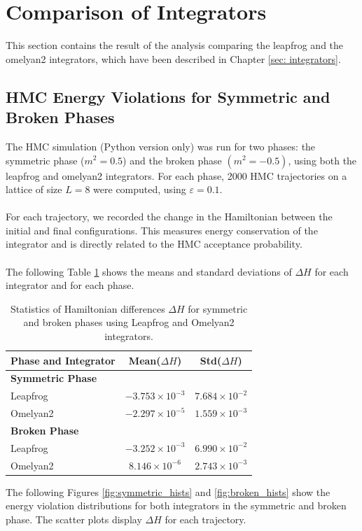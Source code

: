 \section{Comparison of Integrators}\label{sec: int_comparison}
This section contains the result of the analysis comparing the leapfrog and the omelyan2 integrators, which have been described in Chapter \ref{sec: integrators}. 
\subsection{HMC Energy Violations for Symmetric and Broken Phases}
The HMC simulation (Python version only) was run for two phases: the symmetric phase ($m^2 = 0.5$) and the broken phase $(m^2 = -0.5)$, using both the leapfrog and omelyan2 integrators. For each phase, 2000 HMC trajectories on a lattice of size $L = 8$ were computed, using $\varepsilon = 0.1$. \\\\
For each trajectory, we recorded the change in the Hamiltonian between the initial and final configurations. This measures energy conservation of the integrator and is directly related to the HMC acceptance probability.\\\\
The following Table \ref{tab: deltaH_statistics} shows the means and standard deviations of $\Delta H$ for each integrator and for each phase. 
\begin{table}[H]
\centering
\begin{tabular}{lcc}
\hline
\textbf{Phase and Integrator} & \textbf{Mean($\Delta H$)} & \textbf{Std($\Delta H$)} \\
\hline
\textbf{Symmetric Phase} & & \\
\quad Leapfrog & $-3.753\times 10^{-3}$ & $7.684\times 10^{-2}$ \\
\quad Omelyan2 & $-2.297\times 10^{-5}$ & $1.559\times 10^{-3}$ \\
\hline
\textbf{Broken Phase} & & \\
\quad Leapfrog & $-3.252\times 10^{-3}$ & $6.990\times 10^{-2}$ \\
\quad Omelyan2 & $8.146\times 10^{-6}$ & $2.743\times 10^{-3}$ \\
\hline
\end{tabular}
\caption{Statistics of Hamiltonian differences $\Delta H$ for symmetric and broken phases using Leapfrog and Omelyan2 integrators.}
\label{tab: deltaH_statistics}
\end{table}
The following Figures \ref{fig:symmetric_hists} and \ref{fig:broken_hists} show the energy violation distributions for both integrators in the symmetric and broken phase. The scatter plots display $\Delta H$ for each trajectory. 
